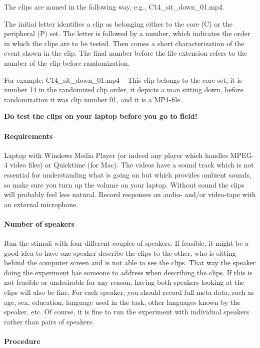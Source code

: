 The clips are named in the following way, e.g., C14\_sit\_down\_01.mp4.

The initial letter identifies a clip as belonging either to the core (C) or the peripheral (P) set. The letter is followed by a number, which indicates the order in which the clips are to be tested. Then comes a short characterization of the event shown in the clip. The final number before the file extension refers to the number of the clip before randomization.

For example: C14\_sit\_down\_01.mp4 -- This clip belongs to the core set, it is number 14 in the randomized clip order, it depicts a man sitting down, before randomization it was clip number 01, and it is a MP4-file.

{\bfseries Do test the clips on your laptop before you go to field!}

\paragraph{Requirements}

Laptop with Windows Media Player (or indeed any player which handles MPEG-4 video files) or Quicktime (for Mac). The videos have a sound track which is not essential for understanding what is going on but which provides ambient sounds, so make sure you turn up the volume on your laptop. Without sound the clips will probably feel less natural. Record responses on audio- and/or video-tape with an external microphone.

\paragraph{Number of speakers}

Run the stimuli with four different couples of speakers. If feasible, it might be a good idea to have one speaker describe the clips to the other, who is sitting behind the computer screen and is not able to see the clips. That way the speaker doing the experiment has someone to address when describing the clips. If this is not feasible or undesirable for any reason, having both speakers looking at the clips will also be fine. For each speaker, you should record full meta-data, such as age, sex, education, language used in the task, other languages known by the speaker, etc. Of course, it is fine to run the experiment with individual speakers rather than pairs of speakers.

\paragraph{Procedure}

